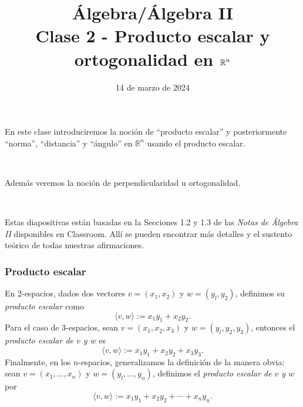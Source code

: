 \documentclass[handout]{beamer} %
\title[Clase 2 - Producto escalar y ortogonalidad]{Álgebra/Álgebra II \\ Clase 2 - Producto escalar y ortogonalidad en $\R^n$}
\institute[]{\normalsize FAMAF / UNC
    \\[\baselineskip] ${}^{}$
    \\[\baselineskip]
}
\date[14/03/2024]{14 de marzo de 2024}
\newcommand{\R}{\mathbb R}
\begin{document}
    
    \frame{\titlepage} 

        
    \begin{frame}
        
        En este clase introduciremos la noción de ``producto escalar'' y posteriormente  ``norma'', ``distancia'' y ``ángulo'' en $\R^n$ usando el producto escalar.
        
        \
        
        Además veremos la noción de perpendicularidad u ortogonalidad.
        
        
        \
        
        Estas diapositivas están basadas en la Secciones 1.2 y  1.3 de las {\it Notas de Álgebra II} disponibles en Classroom. Allí se pueden encontrar más detalles y el sustento teórico de todas nuestras afirmaciones.
    \end{frame}
    
    
    
    
\begin{frame}\frametitle{Producto escalar}
            
    En 2-espacios, dados dos vectores $v = (x_1, x_2)$ y $w= (y_l, y_2)$, definimos su \textit{producto escalar} como
    \begin{equation*}
    \langle v , w  \rangle :=x_1y_1 + x_2y_2.
    \end{equation*}\pause
    Para el caso de 3-espacios, sean   $v = (x_1, x_2,x_3)$ y $w= (y_l, y_2,y_3)$,  entonces el \textit{producto escalar de $v$ y $w$} es
    \begin{equation*}
    \langle v , w  \rangle :=x_1y_1 + x_2y_2+x_3y_3.
    \end{equation*}\pause
    Finalmente, en los $n$-espacios,  generalizamos la definición de la manera obvia: sean  $v = (x_1, \ldots,x_n)$ y $w= (y_l, \ldots,y_n)$,  definimos el \textit{producto escalar de $v$ y $w$} por        
    \begin{equation*}
    \langle v , w \rangle :=x_1y_1 + x_2y_2+\cdots+x_ny_n.
    \end{equation*}
\end{frame}



\end{document}
